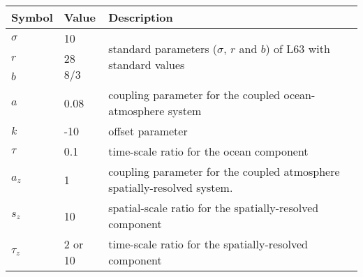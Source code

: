 \documentclass[times,doublespace]{qjrms4}
\begin{document}
	\begin{table*} [H]
	 \label{tab:ModParm}		
	\centering
	\begin{tabular}{ | l | l | p{14cm} |}
		\toprule
		Symbol & Value & Description \\
		\midrule
		$\sigma$ & 10 & \multirow{3}{*}{standard parameters ($\sigma$, $r$ and $b$) of L63 with standard values} \\
		$r$ & 28  & \\
		$b$ & $8/3$ &  \\
		$a$ & 0.08 & coupling parameter for the coupled ocean-atmosphere system \\
		$k$ & -10 & offset parameter \\
		$\tau$ & 0.1 & time-scale ratio for the ocean component\\
		$a_z$ & 1 & coupling parameter for the coupled atmosphere spatially-resolved system. \\
		$s_z$ & 10 & spatial-scale ratio for the spatially-resolved component \\
		$\tau_z$ & 2 or 10 & time-scale ratio for the spatially-resolved component \\
		\bottomrule
	\end{tabular}
	\end{table*}	
\end{document}
